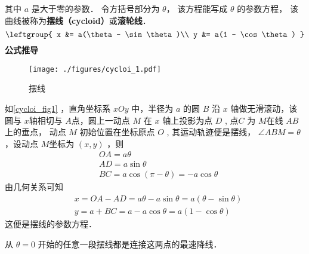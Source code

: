 
\begin{issues}
\issueDraft
\end{issues}

其中 $a$ 是大于零的参数． 令方括号部分为 $\theta$， 该方程能写成 $\theta$ 的参数方程， 该曲线被称为\textbf{摆线（cycloid）}或\textbf{滚轮线}． %
\begin{equation}
\leftgroup{
x &= a(\theta - \sin\theta)\\
y &= a(1 - \cos\theta)
}\end{equation}
\textbf{公式推导}
\begin{figure}[ht]
\centering
\texttt{[image: ./figures/cycloi\_1.pdf]}
\caption{摆线} \label{cycloi_fig1}
\end{figure}
如\autoref{cycloi_fig1} ，直角坐标系 $xOy$ 中，半径为 $a$ 的圆 $B$ 沿 $x$ 轴做无滑滚动，该圆与 $x$轴相切与 $A$点，圆上一动点 $M$ 在 $x$ 轴上投影为点 $D$ , 点$C$ 为 $M$在线 $AB$上的垂点， 动点 $M$ 初始位置在坐标原点 $O$ , 其运动轨迹便是摆线， $\angle ABM=\theta$ ，设动点 $M$坐标为 $(x,y)$ ，则
\begin{equation}
\begin{aligned}
&OA=a\theta \\
&AD=a\sin\theta\\
&BC=a\cos(\pi-\theta)=-a \cos\theta
\end{aligned}
\end{equation}
由几何关系可知
\begin{equation}
\begin{aligned}
&x=OA-AD=a\theta-a\sin\theta=a(\theta-\sin\theta)\\
&y=a+BC=a-a\cos\theta=a(1-\cos\theta)
\end{aligned}
\end{equation}
这便是摆线的参数方程．


从 $\theta = 0$ 开始的任意一段摆线都是连接这两点的最速降线． 
